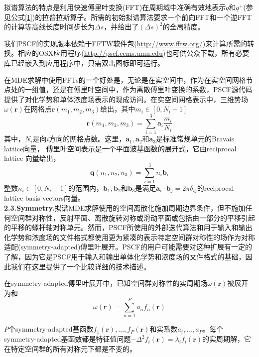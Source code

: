 \documentclass[12pt,a4paper]{article}
\begin{document}
拟谱算法的特点是利用快速傅里叶变换(FFT)在周期域中准确有效地表示$q$和$q^{+}$(参见公式\ref{1})的拉普拉斯算子。所需的初始拟谱算法要求一个前向FFT和一个逆FFT的计算等高线长度时间步长为$\Delta s$，并给出了$(\Delta s)^2$的全局精度。

我们PSCF的实现版本依赖于FFTW软件包(\url{http://www.fftw.org/})来计算所需的转换。相应的OSX应用程序(\url{http://pscf.cems.umn.edu})也可供公众下载，所有必要库已经嵌入到应用程序中，只需双击图标即可运行。

在MDE求解中使用FFTs的一个好处是，无论是在实空间中，作为在实空间网格节点处的一组值，还是在傅里叶空间中，作为离散傅里叶变换的系数，PSCF源代码提供了对化学势和单体浓度场表示的现成访问。在实空间网格表示中，三维势场$\omega (\mathbf{r})$在网格点$\mathbf{r}(m_1,m_2,m_3)$给出，其中$m_i \in \left[ 0,N_i-1 \right]$
\begin{equation}\label{8}
\mathbf{r}(m_1,m_2,m_3)=\sum _{i=1}^{3}\mathbf{a}_i \frac{m_i}{N_i}
\end{equation}
其中，$N_i$是向$i$方向的网格点数。这里，$\mathbf{a}_1,\mathbf{a}_2$和$\mathbf{a}_3$是标准常规单元的Bravais lattice向量，
傅里叶空间表示是一个平面波基函数的展开式，它由reciprocal lattice 向量给出，
\begin{equation}\label{9}
\mathbf{q}(n_1,n_2,n_3)=\sum _{i=1}^{3}n_i\mathbf{b}_i
\end{equation}
整数$n_i\in[0,N_i-1]$的范围内，$\mathbf{b}_1,\mathbf{b}_2$和$\mathbf{b}_3$是满足$\mathbf{a}_i \cdot \mathbf{b}_j=2\pi \delta _{ij}$的reciprocal lattice basis vectors向量。\\
\textbf{2.3.Symmetry.}拟谱MDE求解使用的空间离散化施加周期边界条件，但不施加任何空间群对称性，反射平面、离散旋转对称或滑动平面或包括由一部分的平移引起的平移的螺杆轴对称单元。然而，PSCF所使用的外部迭代算法和用于输入和输出化学势和浓度场的文件格式都使用更为紧凑的表示特定空间群对称性的场作为对称适配(symmetry-adapted)傅里叶展开。PSCF的用户可能需要对这种扩展有一定的了解，因为它是PSCF用于输入和输出单体化学势和浓度场的文件格式的基础，因此我们在这里提供了一个比较详细的技术描述。

在symmetry-adapted傅里叶展开中，已知空间群对称性的实周期场$\omega (\mathbf{r})$被展开为和
\begin{equation}\label{10}
\omega (\mathbf{r})=\sum _{n=1}^{P} a_nf_n(\mathbf{r})
\end{equation}

$P$个symmetry-adapted基函数$f_1(\mathbf{r}),...,f_P(\mathbf{r})$和实系数$a_i,...,a_P$。每个symmetry-adapted基函数都是特征值问题$-\Delta ^2f_i(\mathbf{r})=\lambda _if_i(\mathbf{r})$的实周期解，它在特定空间群的所有对称元下都是不变的。
\end{document}
